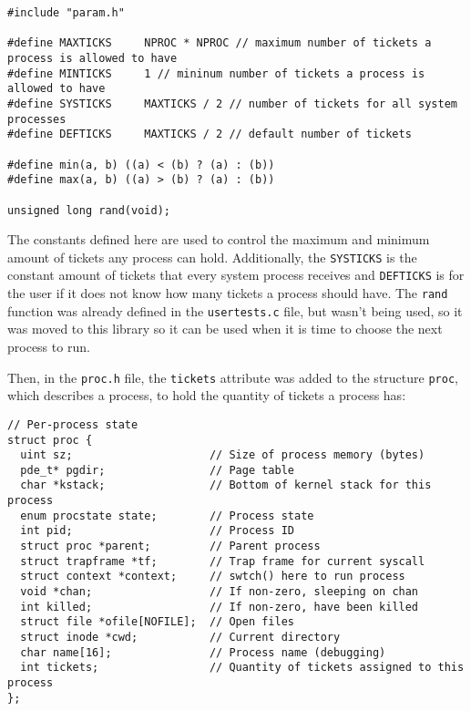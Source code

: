 \documentclass[12pt]{article}
\begin{document}
\begin{scriptsize}
\begin{verbatim}
#include "param.h"

#define MAXTICKS     NPROC * NPROC // maximum number of tickets a process is allowed to have
#define MINTICKS     1 // mininum number of tickets a process is allowed to have
#define SYSTICKS     MAXTICKS / 2 // number of tickets for all system processes
#define DEFTICKS     MAXTICKS / 2 // default number of tickets

#define min(a, b) ((a) < (b) ? (a) : (b))
#define max(a, b) ((a) > (b) ? (a) : (b))

unsigned long rand(void);
\end{verbatim}
\end{scriptsize}

The constants defined here are used to control the maximum and minimum
amount of tickets any process can hold. Additionally, the
\texttt{SYSTICKS} is the constant amount of tickets that every system
process receives and \texttt{DEFTICKS} is for the user if it does not
know how many tickets a process should have. The \texttt{rand} function was
already defined in the \texttt{usertests.c} file, but wasn't being used, so
it was moved to this library so it can be used when it is time to choose
the next process to run.

Then, in the \texttt{proc.h} file, the \texttt{tickets} attribute was
added to the structure \texttt{proc}, which describes a
process, to hold the quantity of tickets a process has:

\begin{scriptsize}
\begin{verbatim}
// Per-process state
struct proc {
  uint sz;                     // Size of process memory (bytes)
  pde_t* pgdir;                // Page table
  char *kstack;                // Bottom of kernel stack for this process
  enum procstate state;        // Process state
  int pid;                     // Process ID
  struct proc *parent;         // Parent process
  struct trapframe *tf;        // Trap frame for current syscall
  struct context *context;     // swtch() here to run process
  void *chan;                  // If non-zero, sleeping on chan
  int killed;                  // If non-zero, have been killed
  struct file *ofile[NOFILE];  // Open files
  struct inode *cwd;           // Current directory
  char name[16];               // Process name (debugging)
  int tickets;                 // Quantity of tickets assigned to this process
};
\end{verbatim}
\end{scriptsize}
\end{document}
